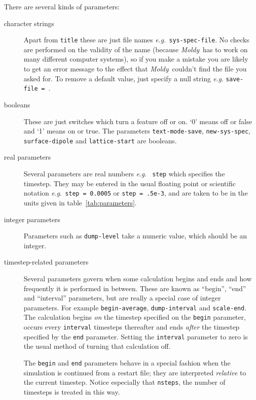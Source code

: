 \documentclass[twoside]{report}
\newcommand{\moldy}{{\em Moldy}}
\newcommand{\eg}{{\em e.g}.\ }
\begin{document}
There are several kinds of parameters:
\begin{description}

\item[character strings] Apart from \texttt{title} these are just file
names \eg \texttt{sys-spec-file}.  No checks
are performed on the validity of the name (because \moldy\  has to work
on many different computer systems), so if you make a mistake you are
likely to get an error message to the effect that \moldy\  couldn't find
the file you asked for.  To remove a default value, just specify a
null string {\em e.g}. \texttt{save-file = }.

\item[booleans] These are just switches which turn a feature off or
on. `0' means off or false and `1' means on or true. The parameters
\texttt{text-mode-save}, \texttt{new-sys-spec}, 
\texttt{surface-dipole} and \texttt{lattice-start} are booleans.

\item[real parameters] Several parameters are real numbers \eg
\texttt{step} which specifies the timestep.  They may be entered in the
usual floating point or scientific notation \eg \mbox{\texttt{step = 0.0005}}
or \mbox{\texttt{step = .5e-3}}, and are taken to be in the units given in
table~\ref{tab:parameters}.

\item[integer parameters] Parameters such as \texttt{dump-level} take a
numeric value, which should be an integer.

\item[timestep-related parameters] Several parameters govern when some
calculation begins and ends and how frequently it is performed in
between. These are known as ``begin'', ``end'' and ``interval''
parameters, but are really a special case of integer parameters.  For
example \texttt{begin-average}, \texttt{dump-interval} and
\texttt{scale-end}.  The calculation begins {\em on\/} the timestep
specified on the \texttt{begin} parameter, occurs every \texttt{interval}
timesteps thereafter and ends {\em after\/} the timestep specified by
the \texttt{end} parameter.  Setting the \texttt{interval} parameter to
zero is the usual method of turning that calculation off.

The \texttt{begin} and \texttt{end} parameters behave in a special fashion
when the simulation is continued from a restart file; they are
interpreted {\em relative\/} to the current timestep.  Notice especially
that \texttt{nsteps}, the number of timesteps is treated in this way.

\end{description}
\end{document}
